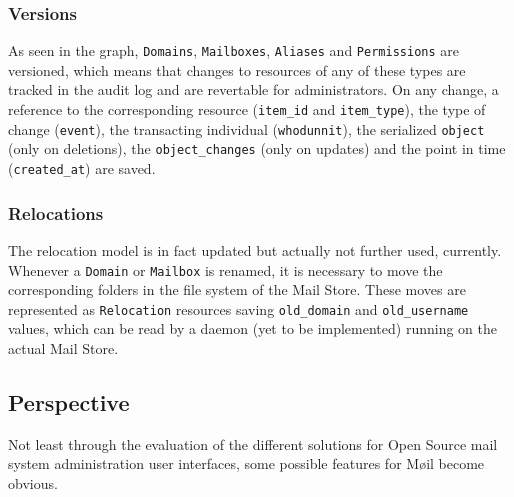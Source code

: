 \documentclass[12pt,a4paper]{scrartcl}
\begin{document}
			\subsubsection{Versions}
				As seen in the graph, \texttt{Domains}, \texttt{Mailboxes},
				\texttt{Aliases} and \texttt{Permissions} are versioned, which
				means that changes to resources of any of these types are
				tracked in the audit log and are revertable for administrators.
				On any change, a reference to the corresponding resource
				(\texttt{item\_id} and \texttt{item\_type}), the type of change
				(\texttt{event}), the transacting individual
				(\texttt{whodunnit}), the serialized \texttt{object} (only on
				deletions), the \texttt{object\_changes} (only on updates) and
				the point in time (\texttt{created\_at}) are saved.

			\subsubsection{Relocations}
			\label{sec:moeil:model:relocation}
				The relocation model is in fact updated but actually not
				further used, currently. Whenever a \texttt{Domain} or
				\texttt{Mailbox} is renamed, it is necessary to move the
				corresponding folders in the file system of the Mail Store.
				These moves are represented as \texttt{Relocation} resources
				saving \texttt{old\_domain} and \texttt{old\_username} values,
				which can be read by a daemon (yet to be implemented) running
				on the actual Mail Store.


		\subsection{Perspective}
			Not least through the evaluation of the different solutions for
			Open Source mail system administration user interfaces, some
			possible features for Møil become obvious.
\end{document}
